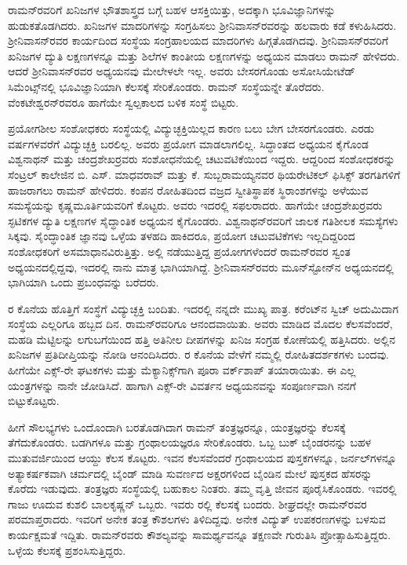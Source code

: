 ರಾಮನ್‍ರವರಿಗೆ ಖನಿಜಗಳ ಭೌತಶಾಸ್ತ್ರದ ಬಗ್ಗೆ ಬಹಳ ಆಸಕ್ತಿಯಿತ್ತು, ಅದಕ್ಕಾಗಿ ಭೂವಿಜ್ಞಾನಿಗಳನ್ನು ಹುಡುಕತೊಡಗಿದರು. ಖನಿಜಗಳ ಮಾದರಿಗಳನ್ನು ಸಂಗ್ರಹಿಸಲು ಶ‍್ರೀನಿವಾಸನ್‍ರವರನ್ನು ಹಲವಾರು ಕಡೆ ಕಳುಹಿಸಿದರು. ಶ‍್ರೀನಿವಾಸನ್‍ರವರ ಕಾರ್ಯದಿಂದ ಸಂಸ್ಥೆಯ ಸಂಗ್ರಹಾಲಯದ ಮಾದರಿಗಳು ಹಿಗ್ಗತೊಡಗಿದವು. ಶ‍್ರೀನಿವಾಸನ್‍ರವರಿಗೆ ಖನಿಜಗಳ ದ್ಯುತಿ ಲಕ್ಷಣಗಳನ್ನೂ ಮತ್ತು ಶಿಲೆಗಳ ಕಾಂತೀಯ ಲಕ್ಷಣಗಳನ್ನು ಅಧ್ಯಯನ ಮಾಡಲು ರಾಮನ್ ಹೇಳಿದರು. ಆದರೆ ಶ‍್ರೀನಿವಾಸನ್‍ರವರ ಅಧ್ಯಯನವು ಮೇಲೇಳಲೇ ಇಲ್ಲ. ಅವರು ಬೇಸರಗೊಂಡು ಅಸೋಸಿಯೇಟೆಡ್ ಸಿಮೆಂಟ್ಸ್‌ನಲ್ಲಿ ಭೂವಿಜ್ಞಾನಿಯಾಗಿ ಕೆಲಸಕ್ಕೆ ಸೇರಿಕೊಂಡರು. ರಾಮನ್ ಸಂಸ್ಥೆಯನ್ನೇ ತೊರೆದರು. ವೆಂಕಟೇಶ್ವರನ್‍ರವರೂ ಹಾಗೆಯೇ ಸ್ವಲ್ಪಕಾಲದ ಬಳಿಕ ಸಂಸ್ಥೆ ಬಿಟ್ಟರು.

ಪ್ರಯೋಗಶೀಲ ಸಂಶೋಧಕರು ಸಂಸ್ಥೆಯಲ್ಲಿ ವಿದ್ಯುಚ್ಛಕ್ತಿಯಿಲ್ಲದ ಕಾರಣ ಬಲು ಬೇಗ ಬೇಸರಗೊಂಡರು. ಎರಡು ವರ್ಷಗಳವರೆಗೆ ವಿದ್ಯುಚ್ಛಕ್ತಿ ಬರಲಿಲ್ಲ. ಅವರು ಪ್ರಯೋಗ ಮಾಡಲಾಗಲಿಲ್ಲ. ಸಿದ್ಧಾಂತದ ಅಧ್ಯಯನ ಕೈಗೊಂಡ ವಿಶ್ವನಾಥನ್ ಮತ್ತು ಚಂದ್ರಶೇಖರ್‍ರವರು ಸಂಶೋಧನೆಯಲ್ಲಿ ಚಟುವಟಿಕೆಯಿಂದ ಇದ್ದರು. ಆದ್ದರಿಂದ ಸಂಶೋಧಕರನ್ನು ಸೆಂಟ್ರಲ್ ಕಾಲೇಜಿನ ಬಿ. ಎಸ್. ಮಾಧವರಾವ್ ಮತ್ತು ಕೆ. ಸುಬ್ಬರಾಮಯ್ಯನವರ ಥಿಯರೇಟಿಕಲ್ ಫಿಸಿಕ್ಸ್ ತರಗತಿಗಳಿಗೆ ಹಾಜರಾಗಲು ರಾಮನ್ ಹೇಳಿದರು. ಕಂಪನ ರೋಹಿತದಿಂದ ವಜ್ರದ ಸ್ವೀತಿಸ್ಥಾಪಕ ಸ್ಥಿರಾಂಶಗಳನ್ನು ಅಳೆಯುವ ಸಮಸ್ಯೆಯನ್ನು ಕೃಷ್ಣಮೂರ್ತಿಯವರಿಗೆ ಕೊಟ್ಟರು. ಅವರು ಇದರಲ್ಲಿ ಸಫಲರಾದರು. ಹಾಗೆಯೇ ಚಂದ್ರಶೇಖರ್‍ರವರು ಸ್ಫಟಿಕಗಳ ದ್ಯುತಿ ಲಕ್ಷಣಗಳ ಸೈದ್ಧಾಂತಿಕ ಅಧ್ಯಯನ ಕೈಗೊಂಡರು. ವಿಶ್ವನಾಥನ್‍ರವರಿಗೆ ಜಾಲಕ ಗತಿಶೀಲಕ ಸಮಸ್ಯೆಗಳು ಸಿಕ್ಕವು. ಸೈಂದ್ಧಾಂತಿಕ ಜ್ಞಾನವು ಒಳ್ಳೆಯ ತಳಹದಿ ಹಾಕಿದರೂ, ಪ್ರಯೋಗ ಚಟುವಟಿಕೆಗಳು ಇಲ್ಲದಿದ್ದರಿಂದ ಸಂಶೋಧಕರಿಗೆ ಅಸಮಾಧಾನವಿರುತ್ತಿತ್ತು. ಅಲ್ಲಿ ನಡೆಯುತ್ತಿದ್ದ ಪ್ರಯೋಗಗಳೆಂದರೆ ರಾಮನ್‍ರವರ ಸ್ವಂತ ಅಧ್ಯಯನದಲ್ಲಿದ್ದವು, ಇದರಲ್ಲಿ ನಾನು ಮಾತ್ರ ಭಾಗಿಯಾಗಿದ್ದೆ. ಶ‍್ರೀನಿವಾಸನ್‍ರವರು ಮೂನ್‍ಸ್ಟೋನ್‍ನ ಅಧ್ಯಯನದಲ್ಲಿ ಭಾಗಿಯಾಗಿ ಒಂದು ಪ್ರಬಂಧವನ್ನು ಬರೆದರು.

ರ ಕೊನೆಯ ಹೊತ್ತಿಗೆ ಸಂಸ್ಥೆಗೆ ವಿದ್ಯುಚ್ಛಕ್ತಿ ಬಂದಿತು. ಇದರಲ್ಲಿ ನನ್ನದೇ ಮುಖ್ಯ ಪಾತ್ರ. ಕರೆಂಟ್‍ನ ಸ್ವಿಚ್ ಅದುಮಿದಾಗ ಸಂಸ್ಥೆಯ ಎಲ್ಲರಿಗೂ ಹಬ್ಬದ ದಿನ. ರಾಮನ್‍ರವರಿಗೂ ಆನಂದವಾಯಿತು. ಅವರು ಮಾಡಿದ ಮೊದಲ ಕೆಲಸವೆಂದರೆ, ಮಹಡಿ ಮೆಟ್ಟಿಲನ್ನು ಲಗುಬಗೆಯಿಂದ ಹತ್ತಿ ಅತಿನೀಲ ದೀಪಗಳನ್ನು ಖನಿಜ ಸಂಗ್ರಹ ಕೋಣೆಯಲ್ಲಿ ಹತ್ತಿಸಿದರು. ಅಲ್ಲಿನ ಖನಿಜಗಳ ಪ್ರತಿದೀಪ್ತಿಯನ್ನು ನೋಡಿ ಆನಂದಿಸಿದರು. ರ ಕೊನೆಯ ವೇಳೆಗೆ ನಮ್ಮಲ್ಲಿ ರೋಹಿತದರ್ಶಕಗಳು ಬಂದವು. ಹೀಗೆಯೇ ಎಕ್ಸ್-ರೇ ಘಟಕಗಳು ಮತ್ತು ಮೆಕ್ಯಾನಿಕ್ಸ್‌ಗಾಗಿ ಪೂರಾ ವರ್ಕ್‌ಶಾಪ್ ತಯಾರಾಯಿತು. ಈ ಎಲ್ಲ ಯಂತ್ರಗಳನ್ನು ನಾನೇ ಜೋಡಿಸಿದೆ. ಹಾಗಾಗಿ ಎಕ್ಸ್-ರೇ ವಿವರ್ತನ ಅಧ್ಯಯನವನ್ನು ಸಂಪೂರ್ಣವಾಗಿ ನನಗೆ ಬಿಟ್ಟುಕೊಟ್ಟರು.

ಹೀಗೆ ಸೌಲಭ್ಯಗಳು ಒಂದೊಂದಾಗಿ ಬರತೊಡಗಿದಾಗ ರಾಮನ್ ತಂತ್ರಜ್ಞರನ್ನೂ, ಯಂತ್ರಜ್ಞರನ್ನು ಕೆಲಸಕ್ಕೆ ತೆಗೆದುಕೊಂಡರು. ಬಡಗಿಗಳೂ ಮತ್ತು ಗ್ರಂಥಾಲಯಜ್ಞರೂ ಸೇರಿಕೊಂಡರು. ಒಬ್ಬ ಬುಕ್ ಬೈಂಡರನನ್ನು ಬಹಳ ಮುತುವರ್ಜಿಯಿಂದ ಆಯ್ದು ಕೆಲಸ ಕೊಟ್ಟರು. ಇವನ ಕೆಲಸವೆಂದರೆ ಗ್ರಂಥಾಲಯದ ಪುಸ್ತಕಗಳನ್ನೂ, ಜರ್ನಲ್‍ಗಳನ್ನೂ ಅತ್ಯಾಕರ್ಷಕವಾಗಿ ಚರ್ಮದಲ್ಲಿ ಬೈಂಡ್ ಮಾಡಿ ಸುವರ್ಣದ ಅಕ್ಷರಗಳಿಂದ ಬೈಂಡಿನ ಮೇಲೆ ಪುಸ್ತಕದ ಹೆಸರನ್ನು ಕೊರೆದು ಇಡುವುದು. ತಂತ್ರಜ್ಞರು ಸಂಸ್ಥೆಯಲ್ಲಿ ಬಹುಕಾಲ ನಿಂತರು. ತಮ್ಮ ವೃತ್ತಿ ಜೀವನ ಪೂರೈಸಿಕೊಂಡರು. ಇವರಲ್ಲಿ ಗಾಜು ಊದುವ ಕುಶಲಿ ಬಾಲಕೃಷ್ಣನ್ ಒಬ್ಬರು. ಇವರು ರಲ್ಲಿ ಕೆಲಸಕ್ಕೆ ಬಂದರು. ಶೀಘ್ರದಲ್ಲೇ ರಾಮನ್‍ರವರ ಪರಮಾಪ್ತರಾದರು. ಇವರಿಗೆ ಅನೇಕ ತಂತ್ರ ಕೌಶಲಗಳು ತಿಳಿದಿದ್ದವು. ಅನೇಕ ವಿದ್ಯುತ್ ಉಪಕರಣಗಳನ್ನು ಬಳಸುವ ಕಾರ್ಯಕ್ಷಮತೆ ಇದ್ದಿತು. ರಾಮನ್‍ರವರು ಕೌಶಲ್ಯವನ್ನು ಸಾಮರ್ಥ್ಯವನ್ನೂ ತಕ್ಷಣವೇ ಗುರುತಿಸಿ ಪ್ರೋತ್ಸಾಹಿಸುತ್ತಿದ್ದರು. ಒಳ್ಳೆಯ ಕೆಲಸಕ್ಕೆ ಪ್ರಶಂಸಿಸುತ್ತಿದ್ದರು.

